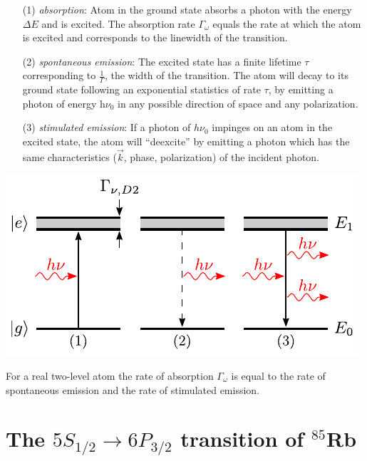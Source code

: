 \begin{minipage}[c][][c]{.55\textwidth}
\begin{itemize}
\item[(1)] \textit{absorption}: Atom in the ground state absorbs a photon with 
    the energy \(\Delta E \) and is excited. The absorption rate \(\Gamma_\omega \)
    equals the rate at which the atom is excited and corresponds to the linewidth 
    of the transition.
\item[(2)] \textit{spontaneous emission}: The excited state has a finite lifetime
    \(\tau \) corresponding to \(\frac{1}{\Gamma} \), the width of the transition.
    The atom will decay to its ground state following an exponential statistics
    of rate \(\tau \), by emitting a photon of energy h\(\nu_0 \) in any possible
    direction of space and any polarization. 
\item[(3)] \textit{stimulated emission}: If a photon of \(h\nu_0 \) impinges on
    an atom in the excited state, the atom will ``deexcite'' by emitting a photon
    which has the same characteristics (\(\vec{k}\), phase, polarization) of the
    incident photon.
\end{itemize}
\end{minipage}
\hfill
\begin{minipage}[c]{.4\textwidth}
    \includegraphics[width=\textwidth]{twolevel}
\end{minipage}
\bigskip

For a real two-level atom the rate of absorption \(\Gamma_\omega \) is equal to
the rate of spontaneous emission and the rate of stimulated emission.

\section{The \(5S_{1/2}\rightarrow 6P_{3/2}\) transition of \(^{85}\)Rb}   %

